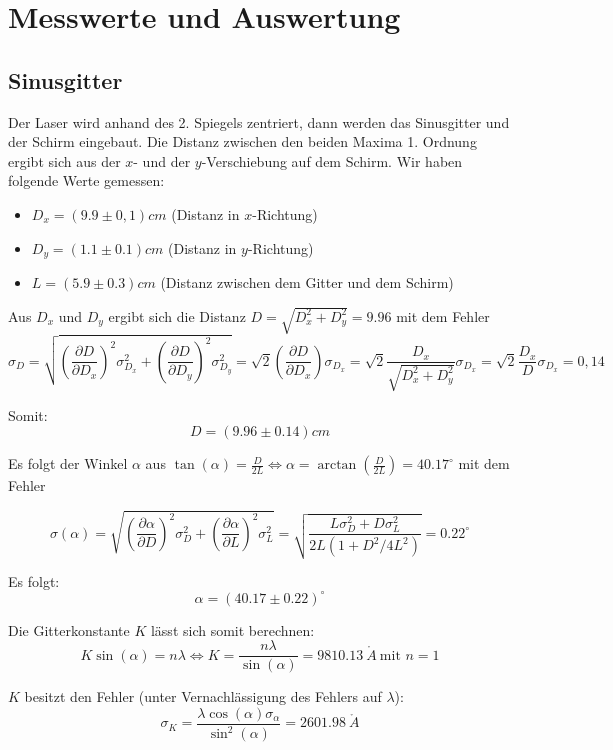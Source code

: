 \section{Messwerte und Auswertung}

\subsection{Sinusgitter}

Der Laser wird anhand des 2. Spiegels zentriert, dann werden das Sinusgitter und der Schirm eingebaut. Die Distanz zwischen den beiden Maxima 1. Ordnung ergibt sich aus der $x$- und der $y$-Verschiebung auf dem Schirm. Wir haben folgende Werte gemessen:
\begin{itemize}
\item $D_x = (9.9 \pm 0,1) cm$ (Distanz in $x$-Richtung)
\item $D_y = (1.1 \pm 0.1) cm$ (Distanz in $y$-Richtung)
\item $L = (5.9 \pm 0.3) cm$ (Distanz zwischen dem Gitter und dem Schirm)
\end{itemize}

Aus $D_x$ und $D_y$ ergibt sich die Distanz $D=\sqrt{D_x^2 + D_y^2} = 9.96$ mit dem Fehler
$$\sigma_D = \sqrt{\left(\frac{\partial D}{\partial D_x}\right)^2\sigma_{D_x}^2 + \left(\frac{\partial D}{\partial D_y}\right)^2\sigma_{D_y}^2} = \sqrt 2 \left(\frac{\partial D}{\partial D_x}\right)\sigma_{D_x} = \sqrt 2 \frac{D_x}{\sqrt{D_x^2 + D_y^2}}\sigma_{D_x} = \sqrt 2 \frac{D_x}{D}\sigma_{D_x} = 0,14$$

Somit: $$\boxed{D = (9.96 \pm 0.14) cm}$$

Es folgt der Winkel $\alpha$ aus $\tan(\alpha) = \frac{D}{2L} \Leftrightarrow\alpha = \arctan\left(\frac{D}{2L}\right) = 40.17^\circ$ mit dem Fehler

$$\sigma(\alpha) = \sqrt{\left(\frac{\partial \alpha}{\partial D}\right)^2\sigma_{D}^2 + \left(\frac{\partial \alpha}{\partial L}\right)^2\sigma_{L}^2} = \sqrt{\frac{L\sigma_D^2 + D\sigma_L^2}{2L(1+D^2/4L^2)}} = 0.22^\circ$$

Es folgt: $$\boxed{\alpha = (40.17 \pm 0.22)^\circ} $$

Die Gitterkonstante $K$ l\"asst sich somit berechnen: $$ K\sin(\alpha) = n\lambda \Leftrightarrow K = \frac{n\lambda}{\sin(\alpha)} = 9810.13 \ \mathring A \ \text{mit \ } n=1$$

$K$ besitzt den Fehler (unter Vernachl\"assigung des Fehlers auf $\lambda$): $$\sigma_K = \frac{\lambda\cos(\alpha)\sigma_\alpha}{\sin^2(\alpha)} = 2601.98 \ \mathring A$$

